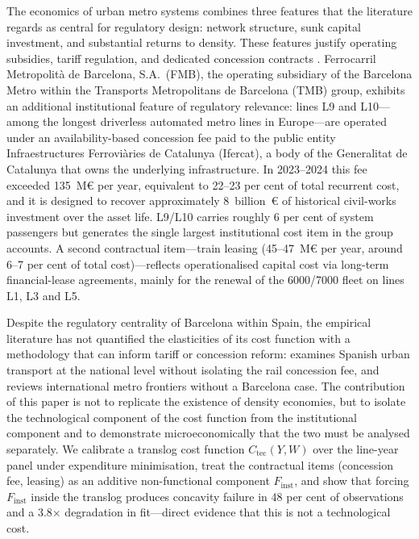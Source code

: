 \documentclass[11pt,a4paper]{article}
\begin{document}
The economics of urban metro systems combines three features that the
literature regards as central for regulatory design: network structure,
sunk capital investment, and substantial returns to density. These features
justify operating subsidies, tariff regulation, and dedicated concession
contracts \citep{joskow2008,gagnepainivaldi2002}. Ferrocarril
Metropolit\`{a} de Barcelona, S.A.\ (FMB), the operating subsidiary of the
Barcelona Metro within the Transports Metropolitans de Barcelona (TMB)
group, exhibits an additional institutional feature of regulatory
relevance: lines L9 and L10---among the longest driverless automated metro
lines in Europe---are operated under an availability-based concession fee
paid to the public entity Infraestructures Ferrovi\`{a}ries de Catalunya
(Ifercat), a body of the Generalitat de Catalunya that owns the underlying
infrastructure. In 2023--2024 this fee exceeded 135~M\euro{} per year,
equivalent to 22--23 per cent of total recurrent cost, and it is designed
to recover approximately 8~billion~\euro{} of historical civil-works
investment over the asset life. L9/L10 carries roughly 6 per cent of
system passengers but generates the single largest institutional cost item
in the group accounts. A second contractual item---train leasing
(45--47~M\euro{} per year, around 6--7 per cent of total cost)---reflects
operationalised capital cost via long-term financial-lease agreements,
mainly for the renewal of the 6000/7000 fleet on lines L1, L3 and L5.

Despite the regulatory centrality of Barcelona within Spain, the empirical
literature has not quantified the elasticities of its cost function with a
methodology that can inform tariff or concession reform:
\citet{matasraymond2009} examines Spanish urban transport at the national
level without isolating the rail concession fee, and \citet{daraio2016}
reviews international metro frontiers without a Barcelona case. The
contribution of this paper is not to replicate the existence of density
economies, but to isolate the technological component of the cost function
from the institutional component and to demonstrate microeconomically that
the two must be analysed separately. We calibrate a translog cost function
$C_{\text{tec}}(Y,W)$ over the line-year panel under expenditure
minimisation, treat the contractual items (concession fee, leasing) as an
additive non-functional component $F_{\text{inst}}$, and show that forcing
$F_{\text{inst}}$ inside the translog produces concavity failure in 48 per
cent of observations and a 3.8$\times$ degradation in fit---direct
evidence that this is not a technological cost.
\end{document}

